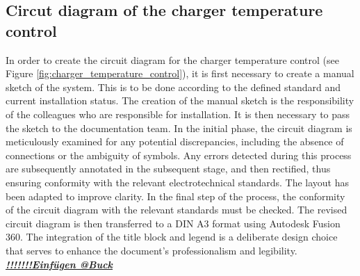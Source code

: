 
\addtocounter{page}{1} %

\subsection{Circut diagram of the charger temperature control}

In order to create the circuit diagram for the charger temperature control (see Figure \ref{fig:charger_temperature_control}), it is first necessary to create a manual sketch of the system. This is to be done according to the defined standard and current installation status. The creation of the manual sketch is the responsibility of the colleagues who are responsible for installation. It is then necessary to pass the sketch to the documentation team. In the initial phase, the circuit diagram is meticulously examined for any potential discrepancies, including the absence of connections or the ambiguity of symbols. Any errors detected during this process are subsequently annotated in the subsequent stage, and then rectified, thus ensuring conformity with the relevant electrotechnical standards. The layout has been adapted to improve clarity. In the final step of the process, the conformity of the circuit diagram with the relevant standards must be checked. The revised circuit diagram is then transferred to a DIN A3 format using Autodesk Fusion 360. The integration of the title block and legend is a deliberate design choice that serves to enhance the document's professionalism and legibility.
\textbf{\textit{\underline{!!!!!!!Einfügen @Buck}}}

